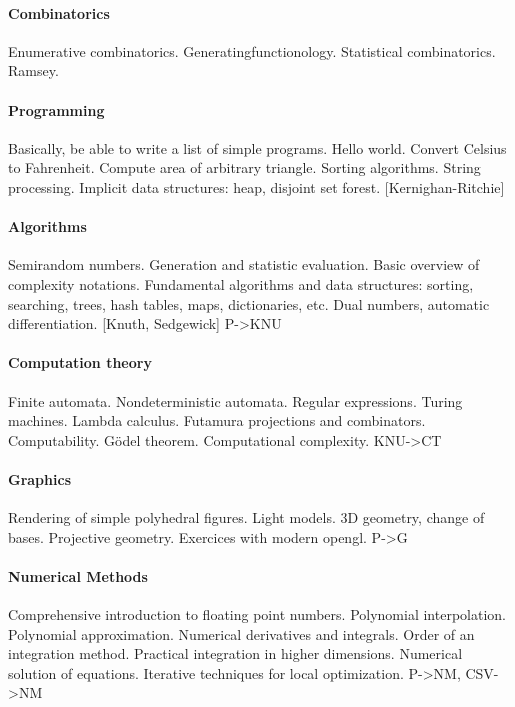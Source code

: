\paragraph{Combinatorics}
Enumerative combinatorics.
Generatingfunctionology.
Statistical combinatorics.  Ramsey.


\paragraph{Programming}
Basically, be able to write a list of simple programs.
Hello world.  Convert Celsius to Fahrenheit.
Compute area of arbitrary triangle.
Sorting algorithms.  String processing.
Implicit data structures: heap, disjoint set forest.
[Kernighan-Ritchie]
{}

\paragraph{Algorithms}
Semirandom numbers.  Generation and statistic evaluation.
Basic overview of complexity notations.
Fundamental algorithms and data structures: sorting, searching, trees, hash
tables, maps, dictionaries, etc.
Dual numbers, automatic differentiation.
[Knuth, Sedgewick]
{P->KNU}

\paragraph{Computation theory}
Finite automata. Nondeterministic automata. Regular expressions.
Turing machines.  Lambda calculus.  Futamura projections and combinators.
Computability.  Gödel theorem.
Computational complexity.
{KNU->CT}

\paragraph{Graphics}
Rendering of simple polyhedral figures.  Light models.
3D geometry, change of bases.  Projective geometry.
Exercices with modern opengl.
{P->G}

\paragraph{Numerical Methods}
Comprehensive introduction to floating point numbers.
Polynomial interpolation.
Polynomial approximation.
Numerical derivatives and integrals.
Order of an integration method.
Practical integration in higher dimensions.
Numerical solution of equations.
Iterative techniques for local optimization.
{P->NM, CSV->NM}

